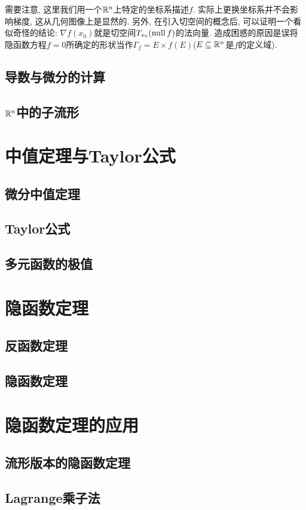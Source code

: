需要注意, 这里我们用一个$\mathbb{R} ^n$上特定的坐标系描述$f$. 实际上更换坐标系并不会影响梯度, 这从几何图像上是显然的. 另外, 在引入切空间的概念后, 可以证明一个看似奇怪的结论: $\nabla f(x_0)$就是切空间$T_{x_0}(\operatorname{null} f)$的法向量. 造成困惑的原因是误将隐函数方程$f=0$所确定的形状当作$\Gamma _f = E \times f(E)$($E \subseteq \mathbb{R} ^n$是$f$的定义域). 





\subsection{导数与微分的计算}

\subsection{$\mathbb{R} ^n$中的子流形}

\newpage
\section{中值定理与Taylor公式}

\subsection{微分中值定理}

\subsection{Taylor公式}

\subsection{多元函数的极值}

\newpage
\section{隐函数定理}

\subsection{反函数定理}

\subsection{隐函数定理}


\newpage
\section{隐函数定理的应用}

\subsection{流形版本的隐函数定理}

\subsection{Lagrange乘子法}